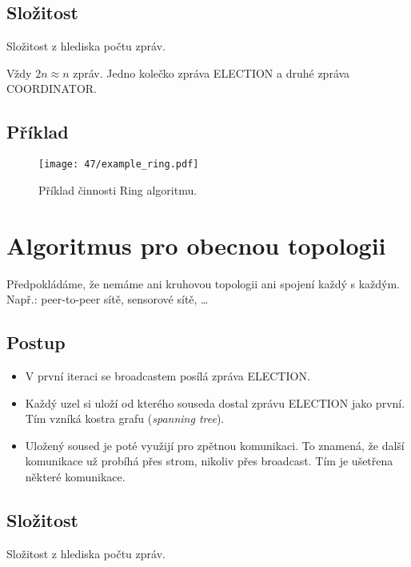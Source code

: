 \subsection*{Složitost}

Složitost z hlediska počtu zpráv.

\bigskip\noindent Vždy $2n \approx n$ zpráv. Jedno kolečko  zpráva ELECTION a druhé zpráva COORDINATOR.

\subsection*{Příklad}

\begin{figure}[H]
    \centering
    \texttt{[image: 47/example\_ring.pdf]}
    \caption{Příklad činnosti Ring algoritmu.}
\end{figure}


\section{Algoritmus pro obecnou topologii}

Předpokládáme, že nemáme ani kruhovou topologii ani spojení každý s každým. Např.: peer-to-peer sítě, sensorové sítě, \dots

\subsection*{Postup}

\begin{itemize}
    \item V první iteraci se broadcastem posílá zpráva ELECTION.
    \item Každý uzel si uloží od kterého souseda dostal zprávu ELECTION jako první. Tím vzníká kostra grafu (\textit{spanning tree}).
    \item Uložený soused je poté využijí pro zpětnou komunikaci. To znamená, že další komunikace už probíhá přes strom, nikoliv přes broadcast. Tím je ušetřena některé komunikace.
\end{itemize}

\subsection*{Složitost}

Složitost z hlediska počtu zpráv.

